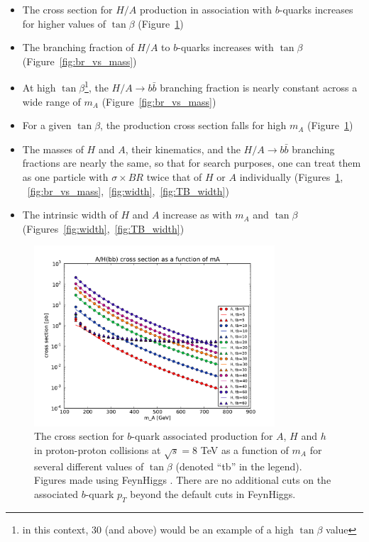 \begin{itemize}
	\item The cross section for $H/A$ production in association 
        with $b$-quarks increases for higher values of $\tan\beta$ (Figure~\ref{fig:xsec_vs_mass})
	\item The branching fraction of $H/A$ to $b$-quarks increases with $\tan\beta$ (Figure~\ref{fig:br_vs_mass})
	\item At high $\tan\beta$\footnote{in this context, 30 (and above) would be an example of a high
        $\tan\beta$ value}, the $H/A\rightarrow b\bar{b}$ branching 
        fraction is nearly constant across a wide range of $m_A$ (Figure~\ref{fig:br_vs_mass})
	\item For a given $\tan\beta$, the production cross section falls for high $m_A$ (Figure~\ref{fig:xsec_vs_mass})
	\item The masses of $H$ and $A$, their kinematics, 
        and the $H/A\rightarrow b\bar{b}$ 
        branching fractions are nearly the same, so that for search purposes, one 
        can treat them as one particle with $\sigma \times BR$ twice 
        that of $H$ or $A$ individually (Figures~\ref{fig:xsec_vs_mass},
        ~\ref{fig:br_vs_mass},~\ref{fig:width},~\ref{fig:TB_width})
	\item The intrinsic width of $H$ and $A$ increase as with $m_A$ and $\tan\beta$ (Figures~\ref{fig:width},~\ref{fig:TB_width})
\end{itemize}





\begin{figure}
	\centering
	\includegraphics[width=0.8\textwidth]{Theory/figures/mssm_xsec/AH_xsec_vs_mass.pdf}
	\caption{The cross section for $b$-quark associated production for
    $A$, $H$ and $h$ in proton-proton collisions at $\sqrt{s}=$8 TeV 
    as a function of $m_A$ for several different values of $\tan\beta$ (denoted ``tb'' in the legend). 
    Figures made using FeynHiggs \cite{feynhiggs_1, feynhiggs_2, feynhiggs_3, feynhiggs_4, feynhiggs_5}.
    There are no additional cuts on the associated $b$-quark $p_T$ beyond the default cuts in FeynHiggs.
    \label{fig:xsec_vs_mass} }
\end{figure}





